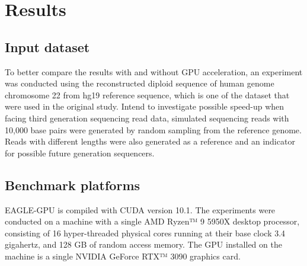 \documentclass{PHlab-thesis}
\begin{document}
\chapter{Results}
\section{Input dataset}
To better compare the results with and without GPU acceleration, an experiment was conducted using the reconstructed diploid sequence of human genome chromosome 22 from hg19 reference sequence, which is one of the dataset that were used in the original study. Intend to investigate possible speed-up when facing third generation sequencing read data, simulated sequencing reads with 10,000 base pairs were generated by random sampling from the reference genome. Reads with different lengths were also generated as a reference and an indicator for possible future generation sequencers.

\section{Benchmark platforms}
EAGLE-GPU is compiled with CUDA version 10.1. The experiments were conducted on a machine with a single AMD Ryzen™ 9 5950X desktop processor, consisting of 16 hyper-threaded physical cores running at their base clock 3.4 gigahertz, and 128 GB of random access memory. The GPU installed on the machine is a single NVIDIA GeForce RTX™ 3090 graphics card.
\end{document}
